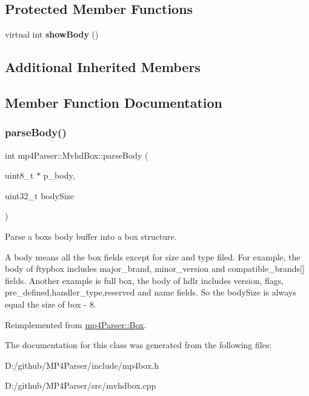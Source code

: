 \subsection*{Protected Member Functions}
\begin{DoxyCompactItemize}
\item 
\mbox{\label{classmp4_parser_1_1_mvhd_box_a320c58a55a8768b3c3215b706d63b11e}} 
virtual int {\bfseries show\+Body} ()
\end{DoxyCompactItemize}
\subsection*{Additional Inherited Members}


\subsection{Member Function Documentation}
\mbox{\label{classmp4_parser_1_1_mvhd_box_accf0bc2bc09ef09f8884e9b27d03b3ac}} 
\subsubsection{\texorpdfstring{parseBody()}{parseBody()}}
{\footnotesize\ttfamily int mp4\+Parser\+::\+Mvhd\+Box\+::parse\+Body (\begin{DoxyParamCaption}\item[{uint8\+\_\+t $\ast$}]{p\+\_\+body,  }\item[{uint32\+\_\+t}]{body\+Size }\end{DoxyParamCaption})\hspace{0.3cm}{\ttfamily [virtual]}}



Parse a box\textquotesingle{}s body buffer into a box structure. 

A body means all the box fields except for size and type filed. For example, the body of ftypbox includes major\+\_\+brand, minor\+\_\+version and compatible\+\_\+brands\mbox{[}\mbox{]} fields. Another example is full box, the body of hdlr includes version, flags, pre\+\_\+defined,handler\+\_\+type,reserved and name fields. So the body\+Size is always equal the size of box -\/ 8. 

Reimplemented from \mbox{\hyperlink{classmp4_parser_1_1_box_a3dd0c084ac65bc77b69ac5ecaf796cb2}{mp4\+Parser\+::\+Box}}.



The documentation for this class was generated from the following files\+:\begin{DoxyCompactItemize}
\item 
D\+:/github/\+M\+P4\+Parser/include/mp4box.\+h\item 
D\+:/github/\+M\+P4\+Parser/src/mvhdbox.\+cpp\end{DoxyCompactItemize}
